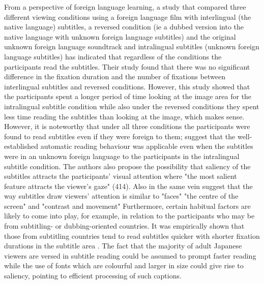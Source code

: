 \documentclass[output=paper]{langsci/langscibook}
\begin{document}
From a perspective of foreign language learning, a study \citep{bisson2014} that compared three different viewing conditions using a foreign language film with interlingual (the native language) subtitles, a reversed condition (ie a dubbed version into the native language with unknown foreign language subtitles) and the original unknown foreign language soundtrack and intralingual subtitles (unknown foreign language subtitles) has indicated that regardless of the conditions the participants read the subtitles. Their study found that there was no significant difference in the fixation duration and the number of fixations between interlingual subtitles and reversed conditions. However, this study showed that the participants spent a longer period of time looking at the image area for the intralingual subtitle condition while also under the reversed conditions they spent less time reading the subtitles than looking at the image, which makes sense. However, it is noteworthy that under all three conditions the participants were found to read subtitles even if they were foreign to them; \citet[pg. 414]{bisson2014} suggest that the well-established automatic reading behaviour was applicable even when the subtitles were in an unknown foreign language to the participants in the intralingual subtitle condition. The authors also propose the possibility that saliency of the subtitles attracts the participants' visual attention where "the most salient feature attracts the viewer's gaze" (414).  Also in the same vein \citet[n.p.]{Kruger2015} suggest that the way subtitles draw viewers' attention is similar to "faces" "the centre of the screen" and "contrast and movement"  Furthermore, certain habitual factors are likely to come into play, for example, in relation to the participants who may be from subtitling- or dubbing-oriented countries. It was empirically shown that those from subtitling countries tend to read subtitles quicker with shorter fixation durations in the subtitle area \citep{Bruycker2007}.  The fact that the majority of adult Japanese viewers are versed in subtitle reading could be assumed to prompt faster reading while the use of fonts which are colourful and larger in size could give rise to saliency, pointing to efficient processing of such captions.   
\end{document}
